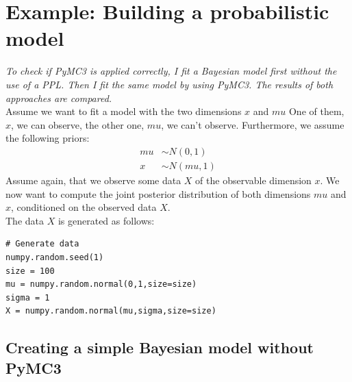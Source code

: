 \documentclass{article}
\begin{document}
\section{Example: Building a probabilistic model}
\label{sec:Comparison}
\textit{To check if PyMC3 is applied correctly, I fit a Bayesian model first without the use of a PPL. Then I fit the same model by using PyMC3. The results of both approaches are compared.}
\\
Assume we want to fit a model with the two dimensions $x$ and $mu$ One of them, $x$, we can observe, the other one, $mu$, we can't observe. Furthermore, we assume the following priors:
\begin{equation}
\label{eq:data_generating_manual_example}
\begin{split}
mu &\sim N(0,1)\\
x &\sim N(mu,1)
\end{split}
\end{equation}
Assume again, that we observe some data $X$ of the observable dimension $x$.
We now want to compute the joint posterior distribution of both dimensions $mu$ and $x$, conditioned on the observed data $X$.
\\
The data $X$ is generated as follows:\\
\begin{lstlisting}[caption = {Data generation for the example model}, label={list:groundtruth_example_code_data_generation}, captionpos=b]
# Generate data
numpy.random.seed(1)
size = 100
mu = numpy.random.normal(0,1,size=size)
sigma = 1
X = numpy.random.normal(mu,sigma,size=size)
\end{lstlisting}

\subsection{Creating a simple Bayesian model without PyMC3}
\label{subsec: Complete example of a simple Bayesian model}
\end{document}
